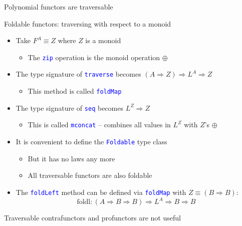 \documentclass[english]{beamer}
\begin{document}
\begin{frame}{Polynomial functors are traversable}
\begin{itemize}
\begin{itemize}
{\begin{frame}{Foldable functors: traversing with respect to a monoid}
\begin{itemize}
\item \vspace{-0.15cm}Take $F^{A}\equiv Z$ where $Z$ is a monoid
\begin{itemize}
\item The \texttt{\textcolor{blue}{\footnotesize{}zip}} operation is the
monoid operation $\oplus$
\end{itemize}
\item The type signature of \texttt{\textcolor{blue}{\footnotesize{}traverse}}
becomes $\left(A\Rightarrow Z\right)\Rightarrow L^{A}\Rightarrow Z$
\begin{itemize}
\item This method is called \texttt{\textcolor{blue}{\footnotesize{}foldMap}} 
\end{itemize}
\item The type signature of \texttt{\textcolor{blue}{\footnotesize{}seq}}
becomes $L^{Z}\Rightarrow Z$
\begin{itemize}
\item This is called \texttt{\textcolor{blue}{\footnotesize{}mconcat}} --
combines all values in $L^{Z}$ with $Z$'s $\oplus$
\end{itemize}
\item It is convenient to define the \texttt{\textcolor{blue}{\footnotesize{}Foldable}}
type class
\begin{itemize}
\item But it has no laws any more
\item All traversable functors are also foldable
\end{itemize}
\item The \texttt{\textcolor{blue}{\footnotesize{}foldLeft}} method can
be defined via \texttt{\textcolor{blue}{\footnotesize{}foldMap}} with
$Z\equiv(B\Rightarrow B)$:
\[
\text{foldl}:\left(A\Rightarrow B\Rightarrow B\right)\Rightarrow L^{A}\Rightarrow B\Rightarrow B
\]
\end{itemize}
\end{frame}

\begin{frame}{Traversable contrafunctors and profunctors are not useful}


\end{frame}}
\end{itemize}
\end{itemize}
\end{frame}
\end{document}
